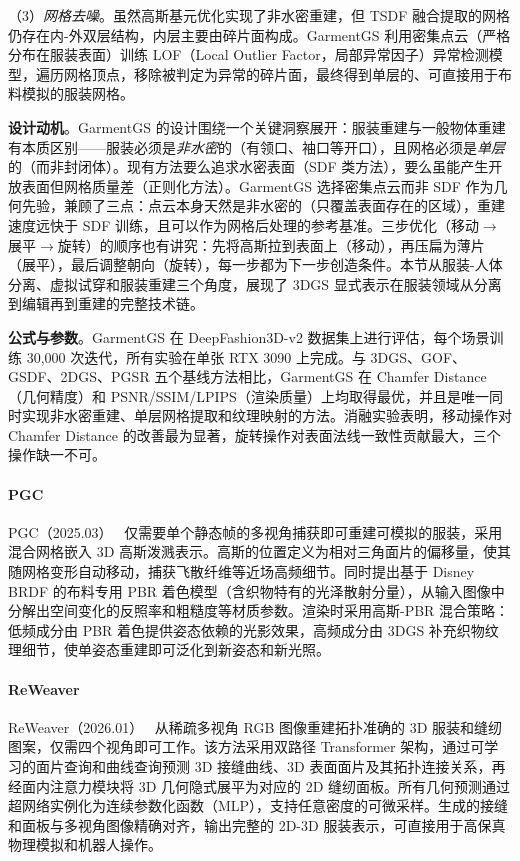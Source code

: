 （3）\emph{网格去噪}。虽然高斯基元优化实现了非水密重建，但 TSDF 融合提取的网格仍存在内-外双层结构，内层主要由碎片面构成。GarmentGS 利用密集点云（严格分布在服装表面）训练 LOF（Local Outlier Factor，局部异常因子）异常检测模型，遍历网格顶点，移除被判定为异常的碎片面，最终得到单层的、可直接用于布料模拟的服装网格。

\textbf{设计动机}。GarmentGS 的设计围绕一个关键洞察展开：服装重建与一般物体重建有本质区别——服装必须是\emph{非水密}的（有领口、袖口等开口），且网格必须是\emph{单层}的（而非封闭体）。现有方法要么追求水密表面（SDF 类方法），要么虽能产生开放表面但网格质量差（正则化方法）。GarmentGS 选择密集点云而非 SDF 作为几何先验，兼顾了三点：点云本身天然是非水密的（只覆盖表面存在的区域），重建速度远快于 SDF 训练，且可以作为网格后处理的参考基准。三步优化（移动$\to$展平$\to$旋转）的顺序也有讲究：先将高斯拉到表面上（移动），再压扁为薄片（展平），最后调整朝向（旋转），每一步都为下一步创造条件。本节从服装-人体分离、虚拟试穿和服装重建三个角度，展现了 3DGS 显式表示在服装领域从分离到编辑再到重建的完整技术链。

\textbf{公式与参数}。GarmentGS 在 DeepFashion3D-v2 数据集上进行评估，每个场景训练 30,000 次迭代，所有实验在单张 RTX 3090 上完成。与 3DGS、GOF、GSDF、2DGS、PGSR 五个基线方法相比，GarmentGS 在 Chamfer Distance（几何精度）和 PSNR/SSIM/LPIPS（渲染质量）上均取得最优，并且是唯一同时实现非水密重建、单层网格提取和纹理映射的方法。消融实验表明，移动操作对 Chamfer Distance 的改善最为显著，旋转操作对表面法线一致性贡献最大，三个操作缺一不可。

\paragraph{PGC}

PGC（2025.03）~\cite{2503_20779} 仅需要单个静态帧的多视角捕获即可重建可模拟的服装，采用混合网格嵌入 3D 高斯泼溅表示。高斯的位置定义为相对三角面片的偏移量，使其随网格变形自动移动，捕获飞散纤维等近场高频细节。同时提出基于 Disney BRDF 的布料专用 PBR 着色模型（含织物特有的光泽散射分量），从输入图像中分解出空间变化的反照率和粗糙度等材质参数。渲染时采用高斯-PBR 混合策略：低频成分由 PBR 着色提供姿态依赖的光影效果，高频成分由 3DGS 补充织物纹理细节，使单姿态重建即可泛化到新姿态和新光照。

\paragraph{ReWeaver}

ReWeaver（2026.01）~\cite{2601_16672} 从稀疏多视角 RGB 图像重建拓扑准确的 3D 服装和缝纫图案，仅需四个视角即可工作。该方法采用双路径 Transformer 架构，通过可学习的面片查询和曲线查询预测 3D 接缝曲线、3D 表面面片及其拓扑连接关系，再经面内注意力模块将 3D 几何隐式展平为对应的 2D 缝纫面板。所有几何预测通过超网络实例化为连续参数化函数（MLP），支持任意密度的可微采样。生成的接缝和面板与多视角图像精确对齐，输出完整的 2D-3D 服装表示，可直接用于高保真物理模拟和机器人操作。

